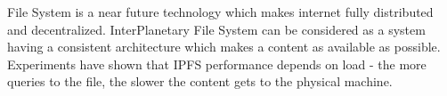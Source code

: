  File System is a near future technology which makes internet fully distributed and decentralized. InterPlanetary File System can be considered as a system having a consistent architecture which makes a content as available as possible. Experiments have shown that IPFS performance depends on load - the more queries to the file, the slower the content gets to the physical machine.